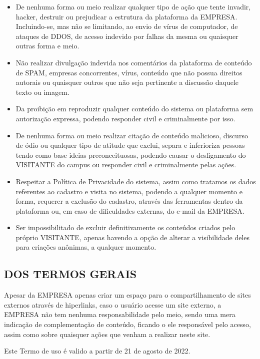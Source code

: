 \begin{itemize}
\item De nenhuma forma ou meio realizar qualquer tipo de ação que tente invadir, hacker, destruir ou prejudicar a estrutura da plataforma da EMPRESA. Incluindo-se, mas não se limitando, ao envio de vírus de computador, de ataques de DDOS, de acesso indevido por falhas da mesma ou quaisquer outras forma e meio.
\item Não realizar divulgação indevida nos comentários da plataforma de conteúdo de SPAM, empresas concorrentes, vírus, conteúdo que não possua direitos autorais ou quaisquer outros que não seja pertinente a discussão daquele texto ou imagem.
\item Da proibição em reproduzir qualquer conteúdo do sistema ou plataforma sem autorização expressa, podendo responder civil e criminalmente por isso.
\item De nenhuma forma ou meio realizar citação de conteúdo malicioso, discurso de ódio ou qualquer tipo de atitude que exclui, separa e inferioriza pessoas tendo como base ideias preconceituosas, podendo causar o desligamento do VISITANTE do campus ou responder civil e criminalmente pelas ações.
\item Respeitar a Política de Privacidade do sistema, assim como tratamos os dados referentes ao cadastro e visita no sistema, podendo a qualquer momento e forma, requerer a exclusão do cadastro, através das ferramentas dentro da plataforma ou, em caso de dificuldades externas, do e-mail da EMPRESA.
\item Ser impossibilitado de excluir definitivamente os conteúdos criados pelo próprio VISITANTE, apenas havendo a opção de alterar a visibilidade deles para criações anônimas, a qualquer momento.
\end{itemize}

\subsection{DOS TERMOS GERAIS}
Apesar da EMPRESA apenas criar um espaço para o compartilhamento de sites externos através de hiperlinks, caso o usuário acesse um site externo, a EMPRESA não tem nenhuma responsabilidade pelo meio, sendo uma mera indicação de complementação de conteúdo, ficando o ele responsável pelo acesso, assim como sobre quaisquer ações que venham a realizar neste site.

Este Termo de uso é valido a partir de 21 de agosto de 2022.
